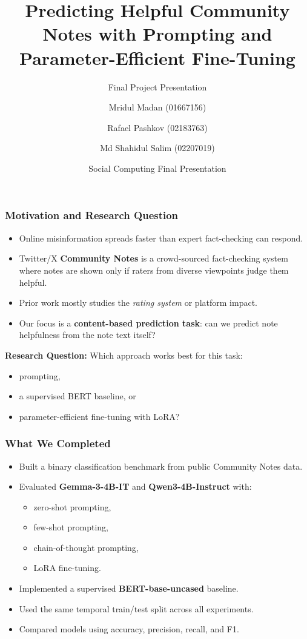 \documentclass[11pt]{beamer}
\title[Helpful Community Notes]{Predicting Helpful Community Notes with Prompting and Parameter-Efficient Fine-Tuning}
\subtitle{Final Project Presentation}
\author[Madan, Pashkov, Salim]{Mridul Madan (01667156) \and Rafael Pashkov (02183763) \and Md Shahidul Salim (02207019)}
\institute[UMass Lowell]{University of Massachusetts Lowell}
\date{Social Computing Final Presentation}
\begin{document}
	
	\begin{frame}
		\titlepage
	\end{frame}
	
	\begin{frame}
		\frametitle{Motivation and Research Question}
		\begin{itemize}
			\item Online misinformation spreads faster than expert fact-checking can respond.
			\item Twitter/X \textbf{Community Notes} is a crowd-sourced fact-checking system where notes are shown only if raters from diverse viewpoints judge them helpful.
			\item Prior work mostly studies the \textit{rating system} or platform impact.
			\item Our focus is a \textbf{content-based prediction task}: can we predict note helpfulness from the note text itself?
		\end{itemize}
		
		\vspace{0.4cm}
		\textbf{Research Question:} Which approach works best for this task:
		\begin{itemize}
			\item prompting,
			\item a supervised BERT baseline, or
			\item parameter-efficient fine-tuning with LoRA?
		\end{itemize}
	\end{frame}
	
	\begin{frame}
		\frametitle{What We Completed}
		\begin{itemize}
			\item Built a binary classification benchmark from public Community Notes data.
			\item Evaluated \textbf{Gemma-3-4B-IT} and \textbf{Qwen3-4B-Instruct} with:
			\begin{itemize}
				\item zero-shot prompting,
				\item few-shot prompting,
				\item chain-of-thought prompting,
				\item LoRA fine-tuning.
			\end{itemize}
			\item Implemented a supervised \textbf{BERT-base-uncased} baseline.
			\item Used the same temporal train/test split across all experiments.
			\item Compared models using accuracy, precision, recall, and F1.
		\end{itemize}
	\end{frame}
	
\end{document}
